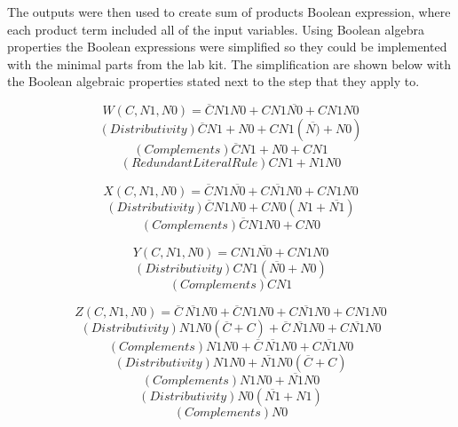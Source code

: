 \documentclass[CMPE]{KGCOEReport}
\begin{document}
The outputs were then used to create sum of products Boolean expression, where each product term included all of the input variables. Using Boolean algebra properties the Boolean expressions were simplified so they could be implemented with the minimal parts from the lab kit. The simplification are shown below with the Boolean algebraic properties stated next to the step that they apply to.

\begin{equation} W(C,N1,N0) = \overline{C}N1N0 + CN1\overline{N0} + CN1N0  \end{equation} 
\begin{equation} (Distributivity) \overline{C}N1+N0 + CN1(\overline{N)} + N0) \end{equation}
\begin{equation} (Complements) \overline{C}N1+N0 + CN1 \end{equation}
\begin{equation} (Redundant Literal Rule) CN1 + N1N0 \end{equation}

\begin{equation} X(C,N1,N0) = \overline{C}N1\overline{N0} + C\overline{N1}N0+CN1N0 \end{equation} 
\begin{equation} (Distributivity) \overline{C}N1N0 + CN0(N1 + \overline{N1}) \end{equation}
\begin{equation} (Complements) \overline{C}N1N0 + CN0 \end{equation}

\begin{equation} Y(C,N1,N0) = CN1\overline{N0} + CN1N0 \end{equation}
\begin{equation} (Distributivity) CN1(\overline{N0} + N0) \end{equation}
\begin{equation} (Complements) CN1 \end{equation}

\begin{equation} Z(C,N1,N0) = \overline{C}\,\overline{N1}N0 + \overline{C}N1N0 + C\overline{N1}N0 + CN1N0 \end{equation}
\begin{equation} (Distributivity) N1N0(\overline{C} + C) + \overline{C }\,\overline{N1}N0 + C\overline{N1}N0 \end{equation}
\begin{equation} (Complements) N1N0 + \overline{C }\,\overline{N1}N0 + C\overline{N1}N0 \end{equation}
\begin{equation} (Distributivity) N1N0 + \overline{N1}N0(\overline{C} + C)	\end{equation}
\begin{equation} (Complements)	N1N0 + \overline{N1}N0 \end{equation}
\begin{equation} (Distributivity) N0(\overline{N1} + N1)	\end{equation}
\begin{equation} (Complements)	N0 \end{equation}
\end{document}
